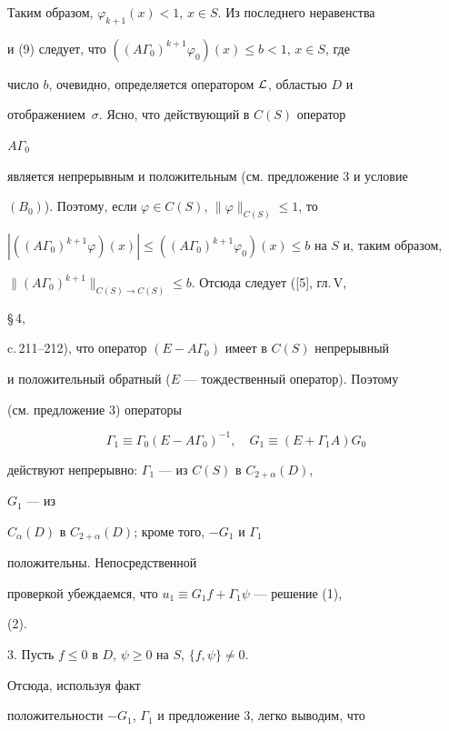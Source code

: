 Таким образом, $\varphi_{k+1}(x)<1$, $x\in S$. Из последнего неравенства 


и (9) следует, что $((A\Gamma_0)^{k+1}\varphi_0)(x)\le b<1$, $x\in S$, где 


число $b$, очевидно, определяется оператором $\cal L$, областью $D$ и 


отображением~$\sigma$. Ясно, что действующий в $C(S)$ оператор 


$A\Gamma_0$ 


является непрерывным и положительным (см. предложение 3 и условие 


$(B_0)$). Поэтому, если $\varphi\in C(S)$, $\|\varphi\|_{C(S)}\le1$, то 


$|((A\Gamma_0)^{k+1}\varphi)(x)|\le((A\Gamma_0)^{k+1} \varphi_0)(x)\le 


b$ на $S$ и, таким образом, 


$\|(A\Gamma_0)^{k+1}\|_{C(S)\to C(S)}\le b$. Отсюда следует ([5], гл.\,V, 


\S\,4, 


c.\,211--212), что оператор $(E-A\Gamma_0)$ имеет в $C(S)$ непрерывный 


и положительный обратный ($E$ --- тождественный оператор). Поэтому 


(см. предложение 3) операторы 


\begin{equation} 


\Gamma_1\equiv\Gamma_0(E-A\Gamma_0)^{-1},\quad 


G_1\equiv(E+\Gamma_1A)G_0 


\end{equation} 


действуют непрерывно: $\Gamma_1$ --- из $C(S)$ в $C_{2+\alpha}(D)$, 


$G_1$ --- из 


$C_\alpha(D)$ в $C_{2+\alpha}(D)$; кроме того, $-G_1$ и $\Gamma_1$ 


положительны. Непосредственной 


проверкой убеждаемся, что $u_1\equiv G_1f+\Gamma_1\psi$ --- решение (1), 


(2). 


\medskip 


 


3. Пусть $f\le0$ в $D$, $\psi\ge0$ на $S$, $\{f,\psi\}\ne0$. 


Отсюда, используя факт 


положительности $-G_1$, $\Gamma_1$ и предложение 3, легко выводим, что 


